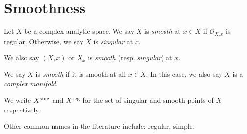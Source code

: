 \section{Smoothness}

\begin{definition}
    Let $X$ be a complex analytic space. We say $X$ is \emph{smooth} at $x\in X$ if $\mathcal{O}_{X,x}$ is regular. Otherwise, we say $X$ is \emph{singular} at $x$.

    We also say $(X,x)$ or $X_x$ is \emph{smooth} (resp. \emph{singular}) at $x$.
    
    We say $X$ is \emph{smooth} if it is smooth at all $x\in X$. In this case, we also say $X$ is a \emph{complex manifold}.

    We write $X^{\operatorname{sing}}$ and $X^{\operatorname{reg}}$ for the set of singular and smooth points of $X$ respectively.
\end{definition}
Other common names in the literature include: regular, simple.

